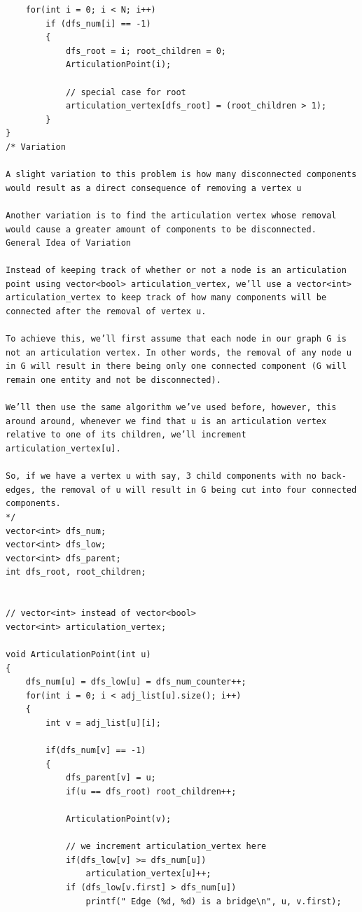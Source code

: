 \documentclass[8pt, a4paper, oneside, twocolumn]{extarticle}
\begin{document}
\begin{itemize}
\begin{verbatim}
    for(int i = 0; i < N; i++)
        if (dfs_num[i] == -1)
        {
            dfs_root = i; root_children = 0;
            ArticulationPoint(i);
            
            // special case for root
            articulation_vertex[dfs_root] = (root_children > 1);
        }
}
/* Variation

A slight variation to this problem is how many disconnected components would result as a direct consequence of removing a vertex u

Another variation is to find the articulation vertex whose removal would cause a greater amount of components to be disconnected.
General Idea of Variation

Instead of keeping track of whether or not a node is an articulation point using vector<bool> articulation_vertex, we’ll use a vector<int> articulation_vertex to keep track of how many components will be connected after the removal of vertex u.

To achieve this, we’ll first assume that each node in our graph G is not an articulation vertex. In other words, the removal of any node u in G will result in there being only one connected component (G will remain one entity and not be disconnected).

We’ll then use the same algorithm we’ve used before, however, this around around, whenever we find that u is an articulation vertex relative to one of its children, we’ll increment articulation_vertex[u].

So, if we have a vertex u with say, 3 child components with no back-edges, the removal of u will result in G being cut into four connected components.
*/
vector<int> dfs_num;
vector<int> dfs_low;
vector<int> dfs_parent;
int dfs_root, root_children;


// vector<int> instead of vector<bool>
vector<int> articulation_vertex;

void ArticulationPoint(int u)
{
    dfs_num[u] = dfs_low[u] = dfs_num_counter++;
    for(int i = 0; i < adj_list[u].size(); i++)
    {
        int v = adj_list[u][i];
        
        if(dfs_num[v] == -1)
        {
            dfs_parent[v] = u;
            if(u == dfs_root) root_children++;

            ArticulationPoint(v);
            
            // we increment articulation_vertex here
            if(dfs_low[v] >= dfs_num[u])
                articulation_vertex[u]++;
            if (dfs_low[v.first] > dfs_num[u])
                printf(" Edge (%d, %d) is a bridge\n", u, v.first);
                

\end{verbatim}
\end{itemize}
\end{document}
